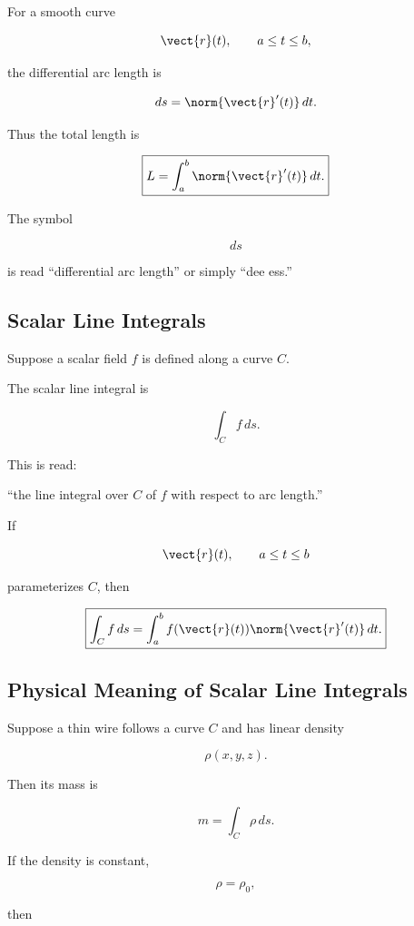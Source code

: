 For a smooth curve

\[ \vect{r}(t),\qquad a\leq t\leq b, \]

the differential arc length is

\[ ds=\norm{\vect{r}'(t)}\,dt. \]

Thus the total length is

\[ \boxed{L=\int_a^b\norm{\vect{r}'(t)}\,dt.} \]

The symbol

\[ ds \]

is read ``differential arc length'' or simply ``dee ess.''

\subsection{Scalar Line Integrals}
\label{subsec:scalar-line-integrals}

Suppose a scalar field \(f\) is defined along a curve \(C\).

The scalar line integral is

\[ \int_C f\,ds. \]

This is read:

``the line integral over \(C\) of \(f\) with respect to arc length.''

If

\[ \vect{r}(t),\qquad a\leq t\leq b \]

parameterizes \(C\), then

\[ \boxed{\int_C f\,ds
=\int_a^b f(\vect{r}(t))\norm{\vect{r}'(t)}\,dt.} \]

\subsection{Physical Meaning of Scalar Line Integrals}
\label{subsec:scalar-line-integral-meaning}

Suppose a thin wire follows a curve \(C\) and has linear density

\[ \rho(x,y,z). \]

Then its mass is

\[ \boxed{m=\int_C\rho\,ds.} \]

If the density is constant,

\[ \rho=\rho_0, \]

then

